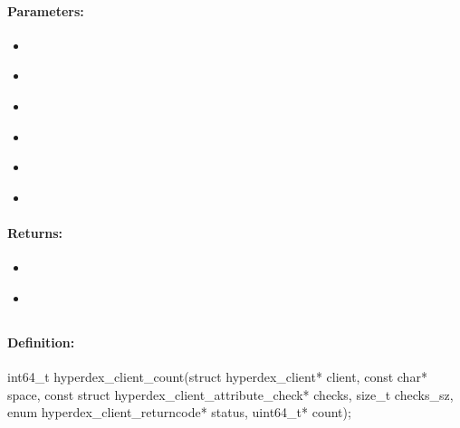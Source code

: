 \paragraph{Parameters:}
\begin{itemize}[noitemsep]
\item {}\\

\item {}\\

\item {}\\

\item {}\\

\item {}\\

\item {}\\

\end{itemize}

\paragraph{Returns:}
\begin{itemize}[noitemsep]
\item {}\\

\item {}\\

\end{itemize}

\pagebreak
\subsection{}
\label{api:c:count}


\paragraph{Definition:}
\begin{ccode}
int64_t hyperdex_client_count(struct hyperdex_client* client,
        const char* space,
        const struct hyperdex_client_attribute_check* checks, size_t checks_sz,
        enum hyperdex_client_returncode* status,
        uint64_t* count);
\end{ccode}

